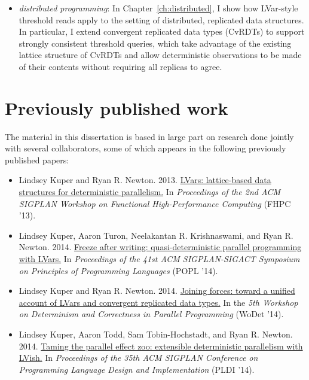 \begin{itemize}
  \item \emph{distributed programming}: In
    Chapter~\ref{ch:distributed}, I show how LVar-style threshold
    reads apply to the setting of distributed, replicated data
    structures.  In particular, I extend convergent replicated data
    types (CvRDTs) to support strongly consistent threshold queries,
    which take advantage of the existing lattice structure of CvRDTs
    and allow deterministic observations to be made of their contents
    without requiring all replicas to agree.
\end{itemize}
\fi

\section{Previously published work}

\ifdefined\DISSERTATION
The material in this dissertation is based in large part on research
done jointly with several collaborators, some of which appears in the
following previously published papers:


\begin{itemize}
\item Lindsey Kuper and Ryan
  R. Newton. 2013. \href{http://doi.acm.org/10.1145/2502323.2502326}{LVars:
    lattice-based data structures for deterministic parallelism.} In
  \emph{Proceedings of the 2nd ACM SIGPLAN Workshop on Functional
    High-Performance Computing} (FHPC '13).

\item Lindsey Kuper, Aaron Turon, Neelakantan R. Krishnaswami, and
  Ryan
  R. Newton. 2014. \href{http://doi.acm.org/10.1145/2535838.2535842
  }{Freeze after writing: quasi-deterministic parallel programming
    with LVars.} In \emph{Proceedings of the 41st ACM SIGPLAN-SIGACT
    Symposium on Principles of Programming Languages} (POPL '14).

\item Lindsey Kuper and Ryan
  R. Newton. 2014. \href{http://wodet.cs.washington.edu/wp-content/uploads/2014/02/wodet2014-final1.pdf}{Joining
    forces: toward a unified account of LVars and convergent
    replicated data types.} In the \emph{5th Workshop on Determinism
    and Correctness in Parallel Programming} (WoDet '14).

\item Lindsey Kuper, Aaron Todd, Sam Tobin-Hochstadt, and Ryan
  R. Newton. 2014. \href{http://doi.acm.org/10.1145/2594291.2594312
  }{Taming the parallel effect zoo: extensible deterministic
    parallelism with LVish.} In \emph{Proceedings of the 35th ACM
    SIGPLAN Conference on Programming Language Design and
    Implementation} (PLDI '14).
\end{itemize}

